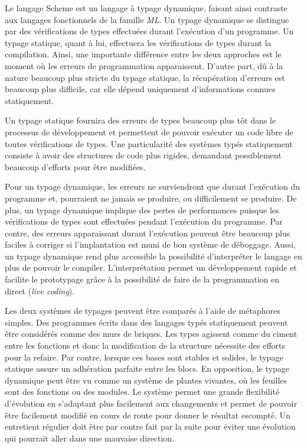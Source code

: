 \documentclass[12pt,oneside,letterpaper,francais]{book}
\begin{document}
Le langage Scheme est un langage à typage dynamique, faisant ainsi
contraste aux langages fonctionnels de la famille \textit{ML}. Un
typage dynamique se distingue par des vérifications de types
effectuées durant l'exécution d'un programme. Un typage statique,
quant à lui, effectuera les vérifications de types durant la
compilation. Ainsi, une importante différence entre les deux approches
est le moment où les erreurs de programmation apparaissent. D'autre
part, dû à la nature beaucoup plus stricte du typage statique, la
récupération d'erreurs est beaucoup plus difficile, car elle dépend
uniquement d'informations connues statiquement.

Un typage statique fournira des erreurs de types beaucoup plus tôt
dans le processus de développement et permettent de pouvoir exécuter
un code libre de toutes vérifications de types. Une particularité des
systèmes typés statiquement consiste à avoir des structures de code
plus rigides, demandant possiblement beaucoup d'efforts pour être
modifiées. 

Pour un typage dynamique, les erreurs ne surviendront que durant
l'exécution du programme et, pourraient ne jamais se produire, ou
difficilement se produire. De plus, un typage dynamique implique des
pertes de performances puisque les vérifications de types sont
effectuées pendant l'exécution du programme. Par contre, des erreurs
apparaissant durant l'exécution peuvent être beaucoup plus faciles à
corriger si l'implantation est muni de bon système de
déboggage. Aussi, un typage dynamique rend plus accessible la
possibilité d'interpréter le langage en plus de pouvoir le
compiler. L'interprétation permet un développement rapide et facilite
le prototypage grâce à la possibilité de faire de la programmation en
direct (\textit{live coding}).

Les deux systèmes de typages peuvent être comparés à l'aide de
métaphores simples. Des programmes écrits dans des langages typés
statiquement peuvent être considérés comme des murs de briques. Les
types agissent comme du ciment entre les fonctions et donc la
modification de la structure nécessite des efforts pour la
refaire. Par contre, lorsque ces bases sont stables et solides, le
typage statique assure un adhération parfaite entre les blocs.  En
opposition, le typage dynamique peut être vu comme un système de
plantes vivantes, où les feuilles sont des fonctions ou des
modules. Le système permet une grande flexibilité d'évolution en
s'adaptant plus facilement aux changements et permet de pouvoir être
facilement modifié en cours de route pour donner le résultat
escompté. Un entretient régulier doit être par contre fait par la
suite pour éviter une évolution qui pourrait aller dans une mauvaise
direction.
\end{document}
